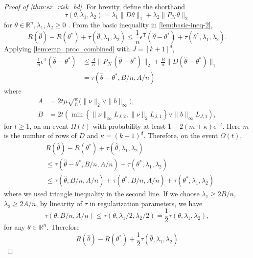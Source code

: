 \documentclass[ejs,noshowframe]{imsart}
\theoremstyle{plain}
\theoremstyle{definition}
\newcommand{\R}{\mathbb{R}}
\newcommand{\cN}{\mathcal{N}}
\renewcommand{\hat}{\widehat}
\renewcommand{\top}{\mathsf{T}}
\begin{document}
\begin{appendix}
\begin{proof}[Proof of \autoref{thm:ex_risk_bd}]
For brevity, define the shorthand
\begin{equation}
\tau(\theta, \lambda_1,\lambda_2) =   \lambda_1 \|D\theta\|_1 + \lambda_2 \| 
P_{\cN} \theta \|_2
\end{equation}
for $\theta\in \R^n, \lambda_1, \lambda_2 \ge 0$ 
.
From the basic inequality in \autoref{lem:basic-ineq-2},
\begin{equation}
\label{eq:basic_ineq_ex_risk_bd}
R(\hat\theta) - R(\theta^*) + \tau(\hat\theta,\lambda_1,\lambda_2)
\leq \frac{1}{n} \epsilon^\top (\hat\theta-\theta^*)+ 
\tau(\theta^*,\lambda_1,\lambda_2).
\end{equation}
Applying \autoref{lem:emp_proc_combined} with $J = [k+1]^d$,
\begin{align}
\frac{1}{n}\epsilon^\top (\hat\theta-\theta^*) 
&\leq \frac{A}{n} \| P_\cN(\hat\theta-\theta^*) \|_2 + \frac{B}{n} \| D 
(\hat\theta-\theta^*) \|_1\\
&= \tau(\hat\theta-\theta^*, B/n, A/n)
\end{align}
where 
\begin{align}
A &= 2t\mu \sqrt{\frac{\kappa}{n}} \big( \| \nu \|_2 \vee \|b\|_\infty\big),\\
B &= 2t\left(\min\left\{ \|\nu\|_\infty  L_{J,2},
	\|\nu\|_2 L_{J,1}\right\}
	\vee\| b \|_\infty L_{J,1}\right),
\end{align}
for $t\geq 1$, on an event $\Omega(t)$ with probability at least 
$1-2(m+\kappa)e^{-t}.$
Here $m$ is the number of rows of $D$ and $\kappa = (k+1)^d$.
Therefore, on the event $\Omega(t)$,
\begin{align}
&R(\hat\theta) - R(\theta^*) + \tau(\hat\theta,\lambda_1,\lambda_2)\\
&\leq \tau(\hat\theta-\theta^*,B/n, A/n ) + \tau(\theta^*,\lambda_1,\lambda_2)\\
&\leq \tau(\hat\theta,B/n, A/n ) + \tau(\theta^*,B/n, A/n ) + 
\tau(\theta^*,\lambda_1,\lambda_2)
\end{align}
where we used triangle inequality in the second line. 
If we choose $\lambda_1 \geq 2 B/n,$ $\lambda_2 \geq 2 A/n$,
by linearity of $\tau$ in regularization parameters, we have 
$$\tau(\theta,B/n, A/n ) \leq \tau(\theta, \lambda_1/2, 
\lambda_2/2 ) = \frac{1}{2} \tau(\theta, \lambda_1, \lambda_2 ),$$ for any 
$\theta \in \R^n$. Therefore
\begin{equation}
R(\hat\theta) - R(\theta^*) + \frac{1}{2}\tau(\hat\theta, \lambda_1, \lambda_2)

\end{equation}
\end{proof}
\end{appendix}
\end{document}
